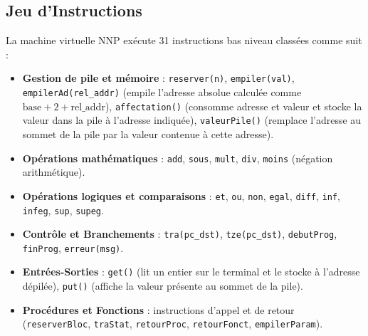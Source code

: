 \documentclass[a4paper, 12pt]{article}
\begin{document}
\subsection{Jeu d'Instructions}
La machine virtuelle NNP exécute 31 instructions bas niveau classées comme suit :
\begin{itemize}
    \item \textbf{Gestion de pile et mémoire} : \texttt{reserver(n)}, \texttt{empiler(val)}, \texttt{empilerAd(}\allowbreak\texttt{rel\_addr)} (empile l'adresse absolue calculée comme $\text{base} + 2 + \text{rel\_addr}$), \texttt{affectation()} (consomme adresse et valeur et stocke la valeur dans la pile à l'adresse indiquée), \texttt{valeurPile()} (remplace l'adresse au sommet de la pile par la valeur contenue à cette adresse).
    \item \textbf{Opérations mathématiques} : \texttt{add}, \texttt{sous}, \texttt{mult}, \texttt{div}, \texttt{moins} (négation arithmétique).
    \item \textbf{Opérations logiques et comparaisons} : \texttt{et}, \texttt{ou}, \texttt{non}, \texttt{egal}, \texttt{diff}, \texttt{inf}, \texttt{infeg}, \texttt{sup}, \texttt{supeg}.
    \item \textbf{Contrôle et Branchements} : \texttt{tra(pc\_dst)}, \texttt{tze(pc\_dst)}, \texttt{debutProg}, \texttt{finProg}, \texttt{erreur(msg)}.
    \item \textbf{Entrées-Sorties} : \texttt{get()} (lit un entier sur le terminal et le stocke à l'adresse dépilée), \texttt{put()} (affiche la valeur présente au sommet de la pile).
    \item \textbf{Procédures et Fonctions} : instructions d'appel et de retour (\texttt{reserverBloc}, \texttt{traStat}, \texttt{retourProc}, \texttt{retourFonct}, \texttt{empilerParam}).
\end{itemize}
\newpage
\end{document}
